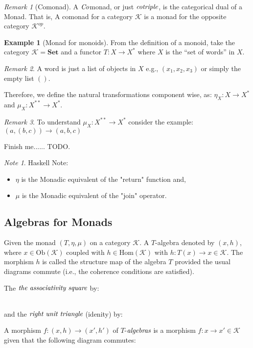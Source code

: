 \documentclass[10pt, oneside, reqno]{amsart}
\theoremstyle{plain}%
\theoremstyle{definition}
\newtheorem{exmp}[thm]{Example}
\theoremstyle{remark}
\newtheorem*{rem}{Remark}
\newtheorem*{note}{Note}
\newcommand{\Id}{\mathit{id}_}
\begin{document}
\begin{rem}[Comonad]
 A $\emph{Co}$monad, or just $\emph{cotriple}$, is the categorical dual of a Monad.
 That is, A comonad for a category $\mathcal{K}$ is a monad for the opposite category $\mathcal{K}^{op}$.
\end{rem}


\begin{exmp}[Monad for monoids]
 From the definition of a monoid,
 take the category $\mathcal{K} = \textbf{Set}$ and a functor $T: X \to X^{*}$ where $X$ is the ``set of words'' in $X$.
 \begin{rem}
  A word is just a list of objects in $X$ e.g., $(x_{1}, x_{2}, x_{3})$ or simply the empty list $()$.
 \end{rem}
 Therefore, we define the natural transformations component wise, as: $\eta_{X}: X \to X^{*}$ and $\mu_{X}: X^{**} \to X^{*}$.
 \begin{rem}
  To understand $\mu_{X}: X^{**} \to X^{*}$ consider the example: $(a, (b, c)) \to (a, b, c)$
 \end{rem}
 Finish me...... TODO.
\end{exmp}

\begin{note}
Haskell Note:
\begin{itemize}
 \item $\eta$ is the Monadic equivalent of the "return" function and,
 \item $\mu$ is the Monadic equivalent of the "join" operator.
\end{itemize}
\end{note}


\subsection{Algebras for Monads} %
\label{sec:monadalgebra}
Given the monad $(T, \eta, \mu)$ on a category $\mathcal{K}$. A $T$-algebra denoted by $(x,h)$,
where $x \in \text{Ob}(\mathcal{K})$ coupled with $h \in \text{Hom}(\mathcal{K})$ with
$h: T(x) \to x \in \mathcal{K}$. The morphism $h$ is called the structure map of the algebra $T$ provided
the usual diagrams commute (i.e., the coherence conditions are satisfied).

The $\emph{the associativity square}$ by:
\\
and the $\emph{right unit triangle}$ (idenity) by:

A morphism $f: (x,h) \to (x',h')$ of $T$-$\emph{algebras}$ is a morphism $f: x \to x' \in \mathcal{K}$
given that the following diagram commutes:
\end{document}
